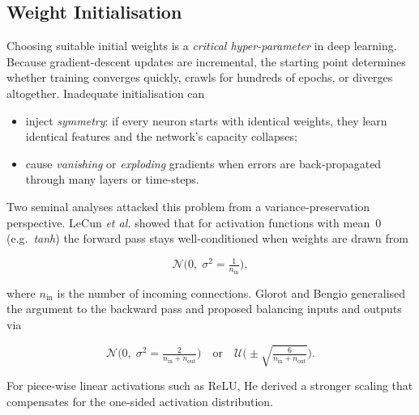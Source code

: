 \documentclass[conference]{IEEEtran}
\begin{document}
\subsection{Weight Initialisation}\label{sec:init}

Choosing suitable initial weights is a \emph{critical hyper-parameter} in deep
learning.  Because gradient-descent updates are incremental, the starting
point determines whether training converges quickly, crawls for hundreds of
epochs, or diverges altogether.  Inadequate initialisation can

\begin{itemize}
  \item inject \emph{symmetry}: if every neuron starts with identical weights,
        they learn identical features and the network’s capacity collapses;
  \item cause \emph{vanishing} or \emph{exploding} gradients when errors are
        back-propagated through many layers or time-steps.
\end{itemize}

Two seminal analyses attacked this problem from a variance-preservation
perspective.  LeCun \textit{et al.} \cite{lecun1998efficient} showed that for
activation functions with mean~0 (e.g.\ \textit{tanh}) the forward pass stays
well-conditioned when weights are drawn from

\[
\mathcal{N}\!\bigl(0,\; \sigma^{2} = \tfrac{1}{n_{\text{in}}}\bigr),
\]

\noindent
where $n_{\text{in}}$ is the number of incoming connections.  Glorot and
Bengio \cite{glorot2010understanding} generalised the argument to the backward
pass and proposed balancing inputs and outputs via

\[
\mathcal{N}\!\bigl(0,\; \sigma^{2} = \tfrac{2}{n_{\text{in}}+n_{\text{out}}}\bigr)
\quad\text{or}\quad
\mathcal{U}\!\bigl(\!\pm \sqrt{\tfrac{6}{n_{\text{in}}+n_{\text{out}}}}\bigr).
\]

For piece-wise linear activations such as ReLU, He
\cite{he2015delving} derived a stronger scaling that compensates for the
one-sided activation distribution.
\end{document}
